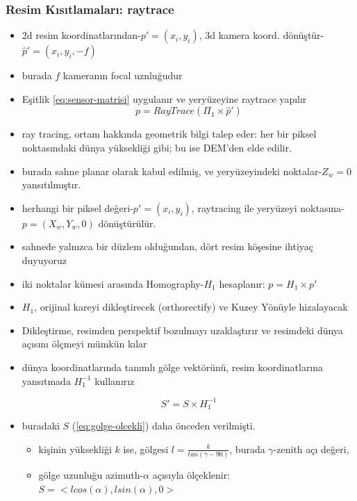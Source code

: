 \documentclass{beamer}
\begin{document}
\begin{frame}[allowframebreaks]
	\frametitle{Resim Kısıtlamaları: raytrace}

	\begin{itemize}
		\item 2d resim koordinatlarından-$p'=(x_i, y_i)$, 3d kamera koord.
			dönüştür- $\hat{p}'=(x_i, y_i, -f)$
		\item burada $f$ kameranın focal uznluğudur
		\item Eşitlik \ref{eq:sensor-matrisi} uygulanır ve yeryüzeyine raytrace
			yapılır
			\begin{equation}
				p = RayTrace(\Pi_1 \times \hat{p}')
				\label{eq:ray-trace}
			\end{equation}
		\item ray tracing, ortam hakkında geometrik bilgi talep eder: her bir
			piksel noktasındaki dünya yüksekliği gibi; bu ise DEM'den elde
			edilir.
		\item burada sahne planar olarak kabul edilmiş, ve yeryüzeyindeki
			noktalar-$Z_w=0$ yansıtılmıştır.
		\item herhangi bir piksel değeri-$p'=(x_i, y_i)$, raytracing ile
			yeryüzeyi noktasına-$p=(X_w,Y_w,0)$ dönüştürülür.
		\item sahnede yalnızca bir düzlem olduğundan, dört resim köşesine
			ihtiyaç duyuyoruz
		\item iki noktalar kümesi arasında Homography-$H_1$ hesaplanır:
			$p = H_1 \times p'$
		\item $H_1$, orijinal kareyi dikleştirecek (orthorectify) ve Kuzey
			Yönüyle hizalayacak
		\item Dikleştirme, resimden perspektif bozulmayı uzaklaştırır ve
			resimdeki dünya açısını ölçmeyi mümkün kılar
		\item dünya koordinatlarında tanımlı gölge vektörünü, resim
			koordinatlarına yansıtmada $H_1^{-1}$ kullanırız

			\begin{equation}
				S' = S \times H_1^{-1}
				\label{eq:diklestirme}
			\end{equation}
		\item buradaki $S$ (\ref{eq:golge-olcekli}) daha önceden verilmişti.

		\begin{itemize}
			\item kişinin yüksekliği $k$ ise, gölgesi
				$l = \frac{k}{tan(\gamma - 90)}$, burada $\gamma$-zenith açı değeri,
			\item gölge uzunluğu azimuth-$\alpha$ açısıyla ölçeklenir:
				$S = <l	cos(\alpha), l sin(\alpha), 0>$
		\end{itemize}
	\end{itemize}
\end{frame}
\end{document}
